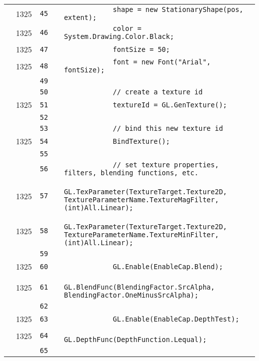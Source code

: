 \documentclass[a4paper,landscape,10pt]{article}
\begin{document}
\begin{longtable}[l]{lrrll}
\cellcolor{green} & 1325 & \verb~45~ & & \verb~            shape = new StationaryShape(pos, extent);~\\
\cellcolor{green} & 1325 & \verb~46~ & & \verb~            color = System.Drawing.Color.Black;~\\
\cellcolor{green} & 1325 & \verb~47~ & & \verb~            fontSize = 50;~\\
\cellcolor{green} & 1325 & \verb~48~ & & \verb~            font = new Font("Arial", fontSize);~\\
\cellcolor{gray} &  & \verb~49~ & & \verb~~\\
\cellcolor{gray} &  & \verb~50~ & & \verb~            // create a texture id~\\
\cellcolor{green} & 1325 & \verb~51~ & & \verb~            textureId = GL.GenTexture();~\\
\cellcolor{gray} &  & \verb~52~ & & \verb~~\\
\cellcolor{gray} &  & \verb~53~ & & \verb~            // bind this new texture id~\\
\cellcolor{green} & 1325 & \verb~54~ & & \verb~            BindTexture();~\\
\cellcolor{gray} &  & \verb~55~ & & \verb~~\\
\cellcolor{gray} &  & \verb~56~ & & \verb~            // set texture properties, filters, blending functions, etc.~\\
\cellcolor{green} & 1325 & \verb~57~ & & \verb~            GL.TexParameter(TextureTarget.Texture2D, TextureParameterName.TextureMagFilter, (int)All.Linear);~\\
\cellcolor{green} & 1325 & \verb~58~ & & \verb~            GL.TexParameter(TextureTarget.Texture2D, TextureParameterName.TextureMinFilter, (int)All.Linear);~\\
\cellcolor{gray} &  & \verb~59~ & & \verb~~\\
\cellcolor{green} & 1325 & \verb~60~ & & \verb~            GL.Enable(EnableCap.Blend);~\\
\cellcolor{green} & 1325 & \verb~61~ & & \verb~            GL.BlendFunc(BlendingFactor.SrcAlpha, BlendingFactor.OneMinusSrcAlpha);~\\
\cellcolor{gray} &  & \verb~62~ & & \verb~~\\
\cellcolor{green} & 1325 & \verb~63~ & & \verb~            GL.Enable(EnableCap.DepthTest);~\\
\cellcolor{green} & 1325 & \verb~64~ & & \verb~            GL.DepthFunc(DepthFunction.Lequal);~\\
\cellcolor{gray} &  & \verb~65~ & & \verb~~\\

\end{longtable}
\end{document}
